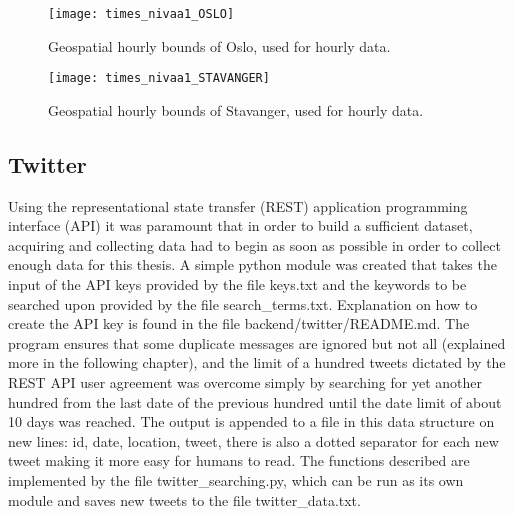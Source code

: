 \begin{figure}[!htb]
\texttt{[image: times\_nivaa1\_OSLO]}
\centering
\caption{Geospatial hourly bounds of Oslo, used for hourly data.}
\label{fig:hboundsoslo}
\end{figure}

\begin{figure}[!htb]
\texttt{[image: times\_nivaa1\_STAVANGER]}
\centering
\caption{Geospatial hourly bounds of Stavanger, used for hourly data.}
\label{fig:hboundsstavanger}
\end{figure}


\newpage

\newpage




\subsection{Twitter}
Using the representational state transfer (REST) application programming interface (API) it was paramount that in order to build a sufficient dataset, acquiring and collecting data had to begin as soon as possible in order to collect enough data for this thesis. A simple python module was created that takes the input of the API keys provided by the file keys.txt and the keywords to be searched upon provided by the file search\_terms.txt. Explanation on how to create the API key is found in the file backend/twitter/README.md. The program ensures that some duplicate messages are ignored but not all (explained more in the following chapter), and the limit of a hundred tweets dictated by the REST API user agreement was overcome simply by searching for yet another hundred from the last date of the previous hundred until the date limit of about 10 days was reached.
The output is appended to a file in this data structure on new lines: id, date, location, tweet, there is also a dotted separator for each new tweet making it more easy for humans to read. The functions described are implemented by the file twitter\_searching.py, which can be run as its own module and saves new tweets to the file twitter\_data.txt.

